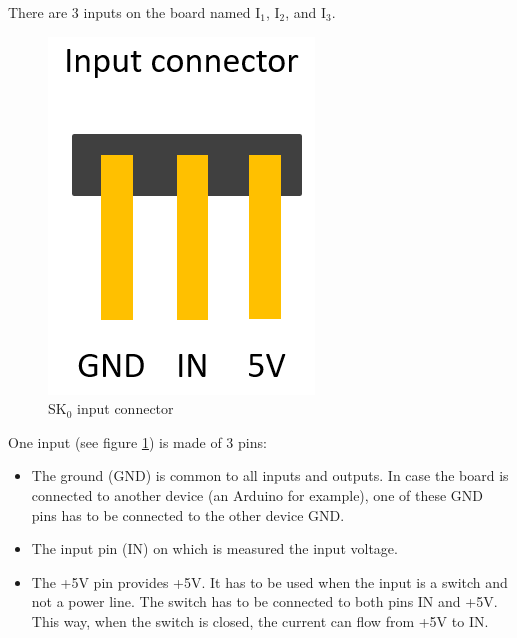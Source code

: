 There are 3 inputs on the board named I$_1$, I$_2$, and I$_3$. \\
\begin{figure}[h]
\centering\includegraphics[scale=0.28]{Pictures/chapterAnnexes/sk0-input.png}
\caption{SK$_0$ input connector}
\label{annexes:SK0-input}
\end{figure}
One input (see figure \ref{annexes:SK0-input}) is made of 3 pins:
\begin{itemize}
    \item The ground (GND) is common to all inputs and outputs. In case the board is connected to another device (an Arduino for example), one of these GND pins has to be connected to the other device GND.
    \item The input pin (IN) on which is measured the input voltage.
    \item The +5V pin provides +5V. It has to be used when the input is a switch and not a power line. The switch has to be connected to both pins IN and +5V. This way, when the switch is closed, the current can flow from +5V to IN. 
\end{itemize}

